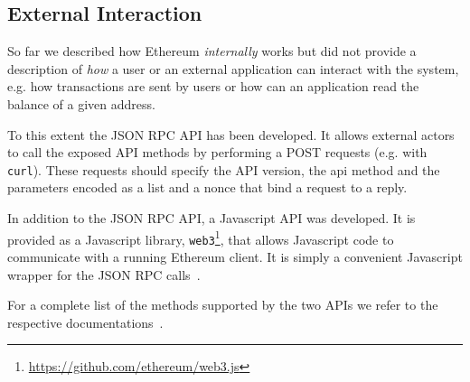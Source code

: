 \subsection{External Interaction}

So far we described how Ethereum \emph{internally} works but did not provide
a description of \emph{how} a user or an external application can interact with 
the system, e.g. how transactions are sent by users or how can an application
read the balance of a given address.

To this extent the JSON RPC API has been 
developed.
It allows external actors to call the exposed API methods by performing a
POST requests (e.g. with \texttt{curl}). These requests should specify the
API version, the api method and the parameters encoded as a list and a nonce
that bind a request to a reply.


In addition to the JSON RPC API, a Javascript API was developed. It is provided
as a Javascript library, 
\texttt{web3}\footnote{\url{https://github.com/ethereum/web3.js}}, that allows
Javascript code to
communicate with a running Ethereum client. It is simply a convenient
Javascript wrapper for the JSON RPC calls~\cite{bib:javascript-api}.

For a complete list of the methods supported by the two APIs we refer to the
respective documentations~\cite{bib:json-rpc, bib:javascript-api}. 

